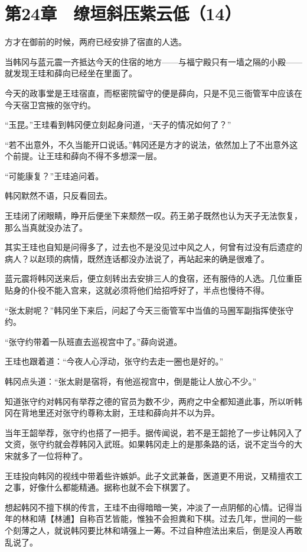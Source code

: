 \section{第24章　缭垣斜压紫云低（14）}

方才在御前的时候，两府已经安排了宿直的人选。

当韩冈与蓝元震一齐抵达今天的住宿的地方——与福宁殿只有一墙之隔的小殿——就发现王珪和薛向已经坐在里面了。

今天的政事堂是王珪宿直，而枢密院留守的便是薛向，只是不见三衙管军中应该在今天宿卫宫掖的张守约。

“玉昆。”王珪看到韩冈便立刻起身问道，“天子的情况如何了？”

“若不出意外，不久当能开口说话。”韩冈还是方才的说法，依然加上了不出意外这个前提。让王珪和薛向不得不多想深一层。

“可能康复？”王珪追问着。

韩冈默然不语，只反看回去。

王珪闭了闭眼睛，睁开后便坐下来颓然一叹。药王弟子既然也认为天子无法恢复，那么当真就没办法了。

其实王珪也自知是问得多了，过去也不是没见过中风之人，何曾有过没有后遗症的病人？以赵顼的病情，既然连话都没办法说了，再站起来的确是很难了。

蓝元震将韩冈送来后，便立刻转出去安排三人的食宿，还有服侍的人选。几位重臣贴身的仆役不能入宫来，这就必须将他们给招呼好了，半点也慢待不得。

“张太尉呢？”韩冈坐下来后，问起了今天三衙管军中当值的马圌军副指挥使张守约。

“张守约带着一队班直去巡视宫中了。”薛向说道。

王珪也跟着道：“今夜人心浮动，张守约去走一圈也是好的。”

韩冈点头道：“张太尉是宿将，有他巡视宫中，倒是能让人放心不少。”

知道张守约对韩冈有举荐之德的官员为数不少，两府之中全都知道此事，所以听韩冈在背地里还对张守约尊称太尉，王珪和薛向并不以为异。

当年王韶举荐，张守约也搭了一把手。据传闻说，若不是王韶抢了一步让韩冈入了文资，张守约就会荐韩冈入武班。如果韩冈走上的是那条路的话，说不定当今的大宋就多了一位将种了。

王珪投向韩冈的视线中带着些许嫉妒。此子文武兼备，医道更不用说，又精擅农工之事，好像什么都能精通。据称也就不会下棋罢了。

想起韩冈不擅下棋的传言，王珪不由得暗暗一笑，冲淡了一点阴郁的心情。记得当年的林和靖【林逋】自称百艺皆能，惟独不会担粪和下棋。过去几年，世间的一些个刻薄之人，就说韩冈要比林和靖强上一筹。不过自种痘法出来后，倒是没人再敢乱说了。


